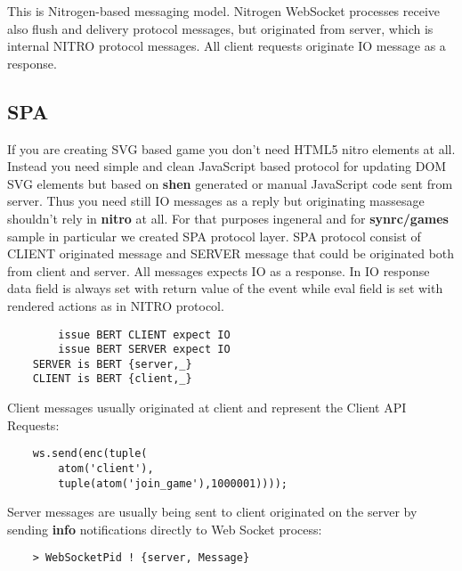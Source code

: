 This is Nitrogen-based messaging model. Nitrogen WebSocket processes receive also
flush and delivery protocol messages, but originated from server, which is internal
NITRO protocol messages. All client requests originate IO message as a response.

\newpage
\subsection{SPA}

If you are creating SVG based game you don't need HTML5 nitro elements at all.
Instead you need simple and clean JavaScript based protocol for updating DOM SVG elements
but based on {\bf shen} generated or manual JavaScript code sent from server.
Thus you need still IO messages as a reply but originating massesage shouldn't
rely in {\bf nitro} at all. For that purposes ingeneral and for {\bf synrc/games} sample
in particular we created SPA protocol layer. SPA protocol consist of CLIENT originated message
and SERVER message that could be originated both from client and server. All messages expects
IO as a response. In IO response data field is always set with return value of the event
while eval field is set with rendered actions as in NITRO protocol.

\vspace{1\baselineskip}
\begin{lstlisting}
        issue BERT CLIENT expect IO
        issue BERT SERVER expect IO
    SERVER is BERT {server,_}
    CLIENT is BERT {client,_}
\end{lstlisting}
\vspace{1\baselineskip}

Client messages usually originated at client and represent the Client API Requests:

\vspace{1\baselineskip}
\begin{lstlisting}
    ws.send(enc(tuple(
        atom('client'),
        tuple(atom('join_game'),1000001))));
\end{lstlisting}
\vspace{1\baselineskip}

Server messages are usually being sent to client originated on the
server by sending {\bf info} notifications directly to Web Socket process:

\begin{lstlisting}
    > WebSocketPid ! {server, Message}
\end{lstlisting}

